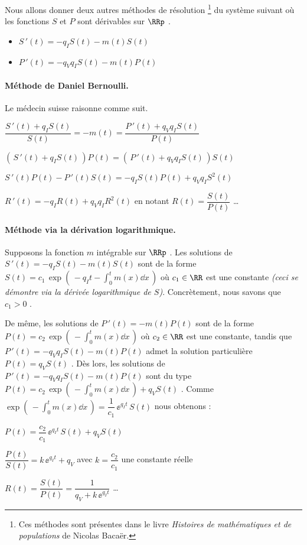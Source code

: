 Nous allons donner deux autres méthodes de résolution
\footnote{
	Ces méthodes sont présentes dans le livre \emph{\og Histoires de mathématiques et de populations \fg} de Nicolas Bacaër. 
}
du système suivant où les fonctions $S$ et $P$ sont dérivables sur $\RRp$ .

\begin{itemize}[label=\small\textbullet]
	\item $S\,'(t) = - q_I S(t) - m(t) S(t)$

	\item $P\,'(t) = - q_V q_I S(t) - m(t) P(t)$
\end{itemize}




\paragraph{Méthode de Daniel Bernoulli.} Le médecin suisse raisonne comme suit.

\bigskip

$\dfrac{S\,'(t) + q_I S(t)}{S(t)} = - m(t) = \dfrac{P\,'(t) + q_V q_I S(t)}{P(t)}$

\medskip

$\left( \, S\,'(t) + q_I S(t) \, \right) P(t) = \left( \, P\,'(t) + q_V q_I S(t) \, \right) S(t)$

\bigskip

$S\,'(t) P(t) - P\,'(t) S(t) = - q_I S(t) P(t) + q_V q_I S^2(t)$

\medskip

$R\,'(t) = - q_I R(t) + q_V q_I R^2(t)$ en notant $R(t) = \dfrac{S(t)}{P(t)}$ \dots





\paragraph{Méthode via la dérivation logarithmique.} Supposons la fonction $m$ intégrable sur $\RRp$ . Les solutions de $S\,'(t) = - q_I S(t) - m(t) S(t)$ sont de la forme $\displaystyle S(t) = c_1 \, \exp \left( \, - q_I t - \int_0^t m(x) \dd{x} \, \right)$ où $c_1 \in \RR$ est une constante \emph{(ceci se démontre via la dérivée logarithmique de $S$)}. Concrètement, nous savons que $c_1 > 0$ .

\medskip

De même, les solutions de $P\,'(t) = - m(t) P(t)$ sont de la forme $\displaystyle P(t) = c_2 \, \exp \left( \, - \int_0^t m(x) \dd{x} \, \right)$ où $c_2 \in \RR$ est une constante, tandis que $P\,'(t) = - q_V q_I S(t) - m(t) P(t)$ admet la solution particulière $P(t) = q_V S(t)$ .
Dès lors, les solutions de $P\,'(t) = - q_V q_I S(t) - m(t) P(t)$ sont du type
$\displaystyle P(t) = c_2 \, \exp \left( \, - \int_0^t m(x) \dd{x} \, \right) + q_V S(t)$ .
Comme $\displaystyle \exp \left( \, - \int_0^t m(x) \dd{x} \, \right) = \dfrac{1}{c_1} \, \ee^{q_I t} \, S(t)$ nous obtenons :

\medskip

$P(t) = \dfrac{c_2}{c_1} \, \ee^{q_I t} \, S(t) + q_V S(t)$

\medskip

$\dfrac{P(t)}{S(t)} = k \, \ee^{q_I t} + q_V$ avec $k = \dfrac{c_2}{c_1}$ une constante réelle

\medskip

$R(t) = \dfrac{S(t)}{P(t)} = \dfrac{1}{q_V + k \, \ee^{q_I t}}$ \dots
